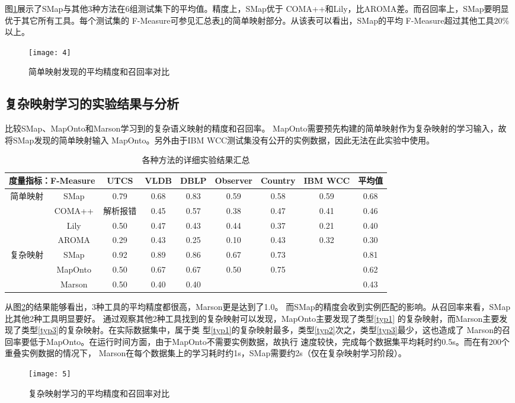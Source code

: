 图\ref{fig4}展示了SMap与其他3种方法在6组测试集下的平均值。精度上，SMap优于
COMA++和Lily，比AROMA差。而召回率上，SMap要明显优于其它所有工具。每个测试集的
F-Measure可参见汇总表\ref{tab2}的简单映射部分。从该表可以看出，SMap的平均
F-Measure超过其他工具20\%以上。


\begin{figure}[htbp]
\centerline{\texttt{[image: 4]}}
\caption{简单映射发现的平均精度和召回率对比}
\label{fig4}
\end{figure}


\subsection{复杂映射学习的实验结果与分析}
\begin{experiment}
比较SMap、MapOnto\cite{10}和Marson\cite{24}学习到的复杂语义映射的精度和召回率。
MapOnto需要预先构建的简单映射作为复杂映射的学习输入，故将SMap发现的简单映射输入
MapOnto。另外由于IBM WCC测试集没有公开的实例数据，因此无法在此实验中使用。
\end{experiment}

\begin{table}[htbp]
\centering
\caption{各种方法的详细实验结果汇总}
\label{tab2}
\footnotesize
\begin{tabular}{ccccccccc}
\hline
\multicolumn{2}{l}{度量指标：F-Measure} &UTCS &VLDB &DBLP &Observer &Country
&IBM WCC &平均值\\
\hline
简单映射&SMap&0.79&0.68&0.83&0.59&0.58&0.59&0.68\\
	&COMA++&解析报错&0.45&0.57&0.38&0.47&0.41&0.46\\
	&Lily&0.50&0.47&0.43&0.44&0.37&0.21&0.40\\
	&AROMA&0.29&0.43&0.25&0.10&0.43&0.32&0.30\\
\hline
复杂映射&SMap&0.92&0.89&0.86&0.67&0.73&&0.81\\
	&MapOnto&0.50&0.67&0.67&0.50&0.75&&0.62\\
	&Marson&0.50&0.40&0.40&&&&0.43\\
\hline  
\end{tabular}
\end{table}

从图\ref{fig5}的结果能够看出，3种工具的平均精度都很高，Marson更是达到了1.0。
而SMap的精度会收到实例匹配的影响。从召回率来看，SMap比其他2种工具明显要好。
通过观察其他2种工具找到的复杂映射可以发现，MapOnto主要发现了类型\ref{typ1}
的复杂映射，而Marson主要发现了类型\ref{typ3}的复杂映射。在实际数据集中，属于类
型\ref{typ1}的复杂映射最多，类型\ref{typ2}次之，类型\ref{typ3}最少，这也造成了
Marson的召回率要低于MapOnto。在运行时间方面，由于MapOnto不需要实例数据，故执行
速度较快，完成每个数据集平均耗时约0.5s。而在有200个重叠实例数据的情况下，
Marson在每个数据集上的学习耗时约1s，SMap需要约2s（仅在复杂映射学习阶段）。
\begin{figure}[htbp]
\centerline{\texttt{[image: 5]}}
\caption{复杂映射学习的平均精度和召回率对比}
\label{fig5}
\end{figure}


